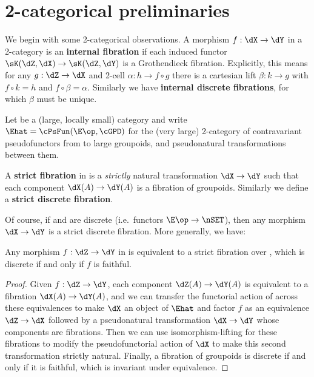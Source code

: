 \section{2-categorical preliminaries}
\label{sec:2cat}

We begin with some 2-categorical observations.
A morphism $f:\dX\to\dY$ in a 2-category \sK is an \textbf{internal fibration} if each induced functor $\sK(\dZ,\dX) \to \sK(\dZ,\dY)$ is a Grothendieck fibration.
Explicitly, this means for any $g:\dZ\to \dX$ and 2-cell $\alpha: h \to f\circ g$ there is a cartesian lift $\beta : k\to g$ with $f\circ k = h$ and  $f\circ \beta = \alpha$.
Similarly we have \textbf{internal discrete fibrations}, for which $\beta$ must be unique.

Let \E be a (large, locally small) category and write $\Ehat = \cPsFun(\E\op,\cGPD)$ for the (very large) 2-category of contravariant pseudofunctors from \E to large groupoids, and pseudonatural transformations between them.

\begin{defn}\label{defn:dfib}
  A \textbf{strict fibration} in \Ehat is a \emph{strictly} natural transformation $\dX\to\dY$ such that each component $\dX(A)\to \dY(A)$ is a fibration of groupoids.
  Similarly we define a \textbf{strict discrete fibration}.
\end{defn}

Of course, if \dX and \dY are discrete (i.e.\ functors $\E\op\to\nSET$), then any morphism $\dX\to\dY$ is a strict discrete fibration.
More generally, we have:

\begin{lem}\label{thm:fib-eqv}
  Any morphism $f:\dZ\to\dY$ in \Ehat is equivalent to a strict fibration over \dY, which is discrete if and only if $f$ is faithful.
\end{lem}
\begin{proof}
  Given $f:\dZ\to\dY$, each component $\dZ(A) \to \dY(A)$ is equivalent to a fibration $\dX(A) \to \dY(A)$, and we can transfer the functorial action of \dZ across these equivalences to make $\dX$ an object of $\Ehat$ and factor $f$ as an equivalence $\dZ\to\dX$ followed by a pseudonatural transformation $\dX\to\dY$ whose components are fibrations.
  Then we can use isomorphism-lifting for these fibrations to modify the pseudofunctorial action of $\dX$ to make this second transformation strictly natural.
  Finally, a fibration of groupoids is discrete if and only if it is faithful, which is invariant under equivalence.
\end{proof}

